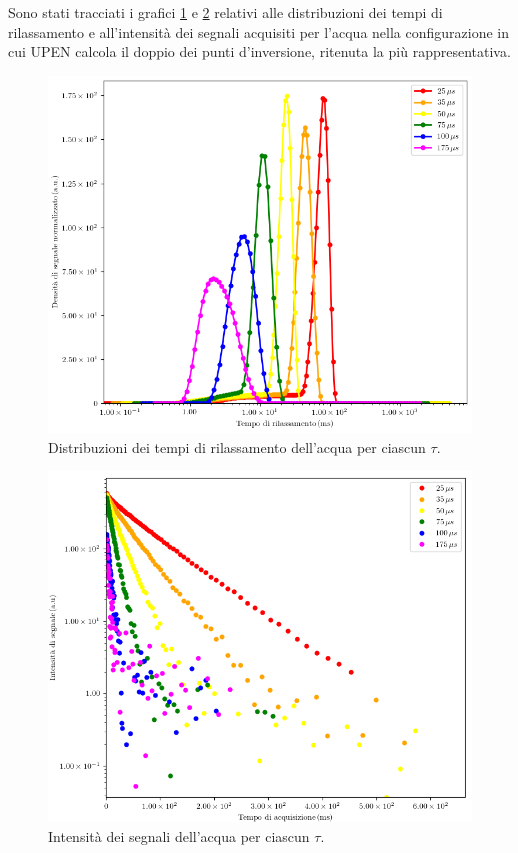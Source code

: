 Sono stati tracciati i grafici \ref{fig:D_h2o} e \ref{fig:S_h2o} relativi alle distribuzioni dei tempi di rilassamento e all'intensità dei segnali acquisiti per l'acqua nella configurazione in cui UPEN calcola il doppio dei punti d'inversione, ritenuta la più rappresentativa.

\begin{figure}[ht]
\centering
\includegraphics[width=\columnwidth]{Figure/H2O.png}
\caption{Distribuzioni dei tempi di rilassamento dell'acqua per ciascun $\tau$.}
\label{fig:D_h2o}
\end{figure}

\begin{figure}[ht]
\centering
\includegraphics[width=\columnwidth]{Figure/H2O_SigTSig.png}
\caption{Intensità dei segnali dell'acqua per ciascun $\tau$.}
\label{fig:S_h2o}
\end{figure}

